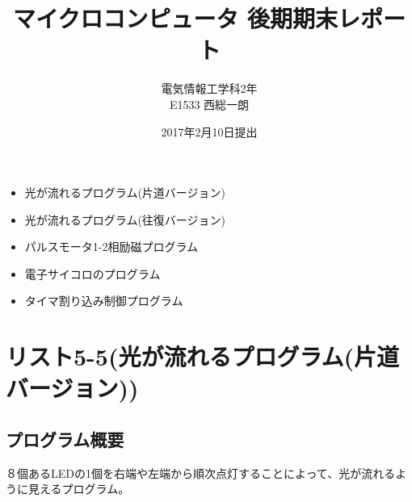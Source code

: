 \documentclass[a4paper,12pt]{ujarticle}
\begin{document}
\title{マイクロコンピュータ 後期期末レポート}
\author{電気情報工学科2年 \\ E1533 西総一朗}
\date{2017年2月10日提出}
\maketitle
\begin{itemize}
 \item \large 光が流れるプログラム(片道バージョン)
 \item 光が流れるプログラム(往復バージョン)
 \item パルスモータ1-2相励磁プログラム
 \item 電子サイコロのプログラム
 \item タイマ割り込み制御プログラム
\end{itemize}
\clearpage
\tableofcontents
\clearpage
 \section{リスト5-5(光が流れるプログラム(片道バージョン))}
  \subsection{プログラム概要}
  ８個あるLEDの1個を右端や左端から順次点灯することによって、光が流れるように見えるプログラム。
\end{document}
